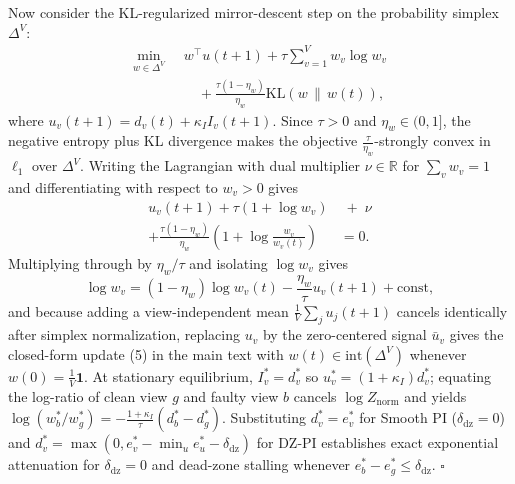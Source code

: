 \documentclass[journal]{IEEEtran}
\begin{document}
Now consider the KL-regularized mirror-descent step on the probability simplex $\Delta^V$:
\begin{equation}
\begin{aligned}
\min_{w \in \Delta^V} \;\; & w^\top u(t+1) + \tau \sum_{v=1}^V w_v \log w_v \\
&\quad + \frac{\tau(1-\eta_w)}{\eta_w} \mathrm{KL}\!\left(w \,\|\, w(t)\right),
\end{aligned}
\end{equation}
where $u_v(t+1) = d_v(t) + \kappa_I I_v(t+1)$. Since $\tau > 0$ and $\eta_w \in (0, 1]$, the negative entropy plus KL divergence makes the objective $\frac{\tau}{\eta_w}$-strongly convex in $\ell_1$ over $\Delta^V$. Writing the Lagrangian with dual multiplier $\nu \in \mathbb{R}$ for $\sum_v w_v = 1$ and differentiating with respect to $w_v > 0$ gives
\begin{equation}
\begin{aligned}
u_v(t+1) + \tau(1 + \log w_v) &\;+\; \nu \\
+ \frac{\tau(1-\eta_w)}{\eta_w}\left(1 + \log\frac{w_v}{w_v(t)}\right) &= 0.
\end{aligned}
\end{equation}
Multiplying through by $\eta_w / \tau$ and isolating $\log w_v$ gives
\begin{equation}
\log w_v = (1-\eta_w)\log w_v(t) - \frac{\eta_w}{\tau} u_v(t+1) + \text{const},
\end{equation}
and because adding a view-independent mean $\frac{1}{V}\sum_j u_j(t+1)$ cancels identically after simplex normalization, replacing $u_v$ by the zero-centered signal $\bar{u}_v$ gives the closed-form update (5) in the main text with $w(t) \in \mathrm{int}(\Delta^V)$ whenever $w(0) = \frac{1}{V}\mathbf{1}$. At stationary equilibrium, $I_v^* = d_v^*$ so $u_v^* = (1+\kappa_I)d_v^*$; equating the log-ratio of clean view $g$ and faulty view $b$ cancels $\log Z_{\mathrm{norm}}$ and yields $\log(w_b^*/w_g^*) = -\frac{1+\kappa_I}{\tau}(d_b^* - d_g^*)$. Substituting $d_v^* = e_v^*$ for Smooth PI ($\delta_{\mathrm{dz}} = 0$) and $d_v^* = \max(0, e_v^* - \min_u e_u^* - \delta_{\mathrm{dz}})$ for DZ-PI establishes exact exponential attenuation for $\delta_{\mathrm{dz}} = 0$ and dead-zone stalling whenever $e_b^* - e_g^* \le \delta_{\mathrm{dz}}$. $\square$
\end{document}
